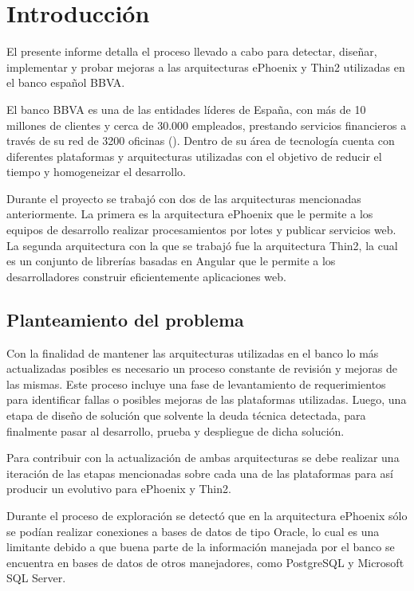 \chapter*{Introducción}
\label{intro}
El presente informe detalla el proceso llevado a cabo
para detectar, diseñar, implementar y probar mejoras a las arquitecturas
ePhoenix y Thin2 utilizadas en el banco español BBVA.


El banco BBVA es una de las entidades líderes de España, con más de 10
millones de clientes y cerca de 30.000 empleados, prestando servicios
financieros a través de su red de 3200 oficinas (\cite{BBVA}). Dentro de
su área de tecnología cuenta con diferentes plataformas y arquitecturas
utilizadas con el objetivo de reducir el tiempo y homogeneizar el desarrollo.

Durante el proyecto se trabajó con dos de las arquitecturas mencionadas anteriormente.
La primera es la arquitectura ePhoenix que le permite a los equipos de desarrollo
realizar procesamientos por lotes y publicar servicios web. La segunda arquitectura
con la que se trabajó fue la arquitectura Thin2, la cual es un conjunto de librerías
basadas en Angular que le permite a los desarrolladores construir eficientemente
aplicaciones web.

\section*{Planteamiento del problema}

Con la finalidad de mantener las arquitecturas utilizadas en el banco lo
más actualizadas posibles es necesario un proceso constante de revisión y mejoras de
las mismas. Este proceso incluye una fase de levantamiento de requerimientos
para identificar fallas o posibles mejoras de las plataformas utilizadas. Luego,
una etapa de diseño de solución que solvente la deuda técnica detectada, para
finalmente pasar al desarrollo, prueba y despliegue de dicha solución.

Para contribuir con la actualización de ambas arquitecturas se debe realizar
una iteración de las etapas mencionadas sobre cada una de las plataformas para
así producir un evolutivo para ePhoenix y Thin2.

Durante el proceso de exploración se detectó que en la arquitectura ePhoenix sólo
se podían realizar conexiones a bases de datos de tipo Oracle, lo cual es una limitante
debido a que buena parte de la información manejada por el banco se encuentra en
bases de datos de otros manejadores, como PostgreSQL y Microsoft SQL Server.

